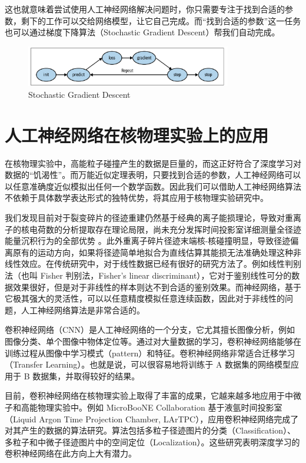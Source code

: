 \documentclass[AutoFakeBold]{LZUThesis}
\begin{document}
这也就意味着尝试使用人工神经网络解决问题时，你只需要专注于找到合适的参数，剩下的工作可以交给网络模型，让它自己完成。而“找到合适的参数”这一任务也可以通过梯度下降算法（Stochastic Gradient Descent）帮我们自动完成。

\begin{figure}[H]
    \centering
    \includegraphics[width=0.8\textwidth]{figures/SGD.png}
    \caption{Stochastic Gradient Descent}
    \label{fig_SGD}
\end{figure}






\section{人工神经网络在核物理实验上的应用}
在核物理实验中，高能粒子碰撞产生的数据是巨量的，而这正好符合了深度学习对数据的“饥渴性”。而万能近似定理表明，只要找到合适的参数，人工神经网络可以以任意准确度近似模拟出任何一个数学函数。因此我们可以借助人工神经网络算法不依赖于具体数学表达形式的独特优势，将其应用于核物理实验研究中。

我们发现目前对于裂变碎片的径迹重建仍然基于经典的离子能损理论，导致对重离子的核电荷数的分析提取存在理论局限，尚未充分发挥时间投影室详细测量全径迹能量沉积行为的全部优势 \cite{魏康2019基于GEM工艺的裂变时间投影室中裂变碎片的讨论}。此外重离子碎片径迹末端核-核碰撞明显，导致径迹偏离原有的运动方向，如果将径迹简单地拟合为直线估算其能损无法准确处理这种非线性效应。在传统研究中，对于线性数据已经有很好的研究方法了。例如线性判别法（也叫 Fisher 判别法，Fisher's linear discriminant）\cite{fisher1936use}，它对于鉴别线性可分的数据效果很好，但是对于非线性的样本则达不到合适的鉴别效果。而神经网络，基于它极其强大的灵活性，可以以任意精度模拟任意连续函数，因此对于非线性的问题，人工神经网络算法是非常合适的。

卷积神经网络（CNN）是人工神经网络的一个分支，它尤其擅长图像分析，例如图像分类、单个图像中物体定位等。通过对大量数据的学习，卷积神经网络能够在训练过程从图像中学习模式（pattern）和特征。卷积神经网络非常适合迁移学习（Transfer Learning）。也就是说，可以很容易地将训练于 A 数据集的网络模型应用于 B 数据集，并取得较好的结果。

目前，卷积神经网络在核物理实验上取得了丰富的成果，它越来越多地应用于中微子和高能物理实验中\cite{radovic2018machine, abratenko2020convolutional, abi2020neutrino, acciarri2017convolutional, racah2016revealing, aurisano2016convolutional, renner2017background}。例如 MicroBooNE Collaboration 基于液氩时间投影室（Liquid Argon Time Projection Chamber, LArTPC），应用卷积神经网络完成了对其产生的数据的算法研究。算法包括多粒子径迹图片的分类（Classification）、多粒子和中微子径迹图片中的空间定位（Localization）\cite{abratenko2020convolutional}。这些研究表明深度学习的卷积神经网络在此方向上大有潜力。
\end{document}
